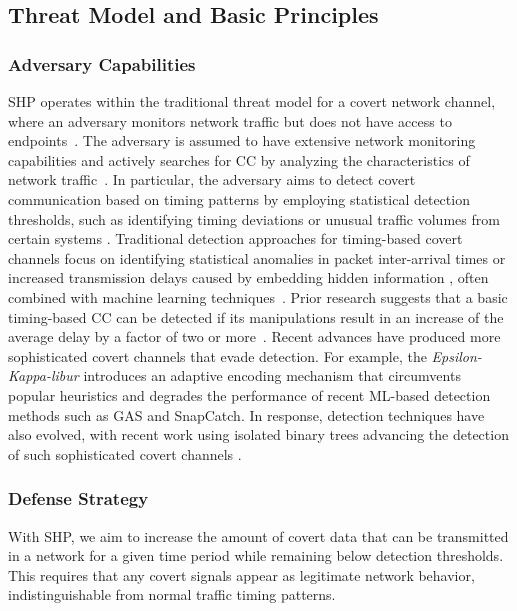 \documentclass[journal]{IEEEtran}
\begin{document}
\subsection{Threat Model and Basic Principles}

\subsubsection{Adversary Capabilities}
\ac{SHP} operates within the traditional threat model for a covert network channel, where an adversary monitors network traffic but does not have access to endpoints~\cite{Vivek2014Improving,Liu2013RealTime}. The adversary is assumed to have extensive network monitoring capabilities and actively searches for \ac{CC} by analyzing the characteristics of network traffic~\cite{GAS22,Ayub2019A}. In particular, the adversary aims to detect covert communication based on timing patterns by employing statistical detection thresholds, such as identifying timing deviations or unusual traffic volumes from certain systems \cite{Ondov2022Covert,Iglesias2017Are}.
Traditional detection approaches for timing-based covert channels focus on identifying statistical anomalies in packet inter-arrival times or increased transmission delays caused by embedding hidden information \cite{Iglesias2017Are,Chen2015A,Djidjev2011Graph}, often combined with machine learning techniques~\cite{Darwish2019Using,Epishkina2019Timing}. Prior research suggests that a basic timing-based \ac{CC} can be detected if its manipulations result in an increase of the average delay by a factor of two or more~\cite{aleidi20}.
Recent advances have produced more sophisticated covert channels that evade detection. For example, the \textit{Epsilon-Kappa-libur}\cite{epskappa24} introduces an adaptive encoding mechanism that circumvents popular heuristics and degrades the performance of recent ML-based detection methods such as GAS and SnapCatch\cite{GAS22,snapcatch20}. In response, detection techniques have also evolved, with recent work using isolated binary trees advancing the detection of such sophisticated covert channels \cite{LIN2025104200}.

\subsubsection{Defense Strategy}
With \ac{SHP}, we aim to increase the amount of covert data that can be transmitted in a network for a given time period while remaining below detection thresholds. This requires that any covert signals appear as legitimate network behavior, indistinguishable from normal traffic timing patterns. 
\end{document}
